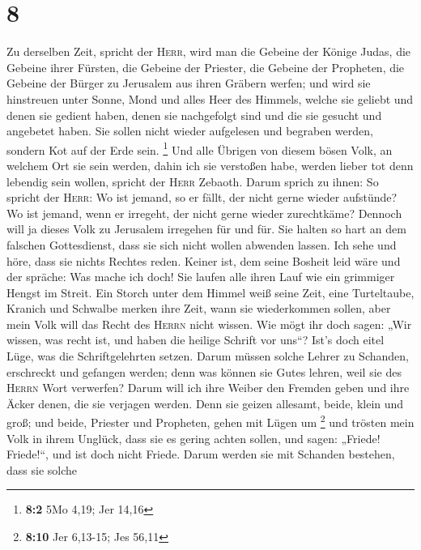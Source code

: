 \hypertarget{section-2}{%
\section{8}\label{section-2}}

 Zu derselben Zeit, spricht der \textsc{Herr}, wird man
die Gebeine der Könige Judas, die Gebeine ihrer Fürsten, die Gebeine der
Priester, die Gebeine der Propheten, die Gebeine der Bürger zu Jerusalem
aus ihren Gräbern werfen;  und wird sie hinstreuen unter
Sonne, Mond und alles Heer des Himmels, welche sie geliebt und denen sie
gedient haben, denen sie nachgefolgt sind und die sie gesucht und
angebetet haben. Sie sollen nicht wieder aufgelesen und begraben werden,
sondern Kot auf der Erde sein. \footnote{\textbf{8:2} 5Mo 4,19; Jer
  14,16}  Und alle Übrigen von diesem bösen Volk, an
welchem Ort sie sein werden, dahin ich sie verstoßen habe, werden lieber
tot denn lebendig sein wollen, spricht der \textsc{Herr} Zebaoth.
 Darum sprich zu ihnen: So spricht der \textsc{Herr}: Wo
ist jemand, so er fällt, der nicht gerne wieder aufstünde? Wo ist
jemand, wenn er irregeht, der nicht gerne wieder zurechtkäme?
 Dennoch will ja dieses Volk zu Jerusalem irregehen für
und für. Sie halten so hart an dem falschen Gottesdienst, dass sie sich
nicht wollen abwenden lassen.  Ich sehe und höre, dass sie
nichts Rechtes reden. Keiner ist, dem seine Bosheit leid wäre und der
spräche: Was mache ich doch! Sie laufen alle ihren Lauf wie ein
grimmiger Hengst im Streit.  Ein Storch unter dem Himmel
weiß seine Zeit, eine Turteltaube, Kranich und Schwalbe merken ihre
Zeit, wann sie wiederkommen sollen, aber mein Volk will das Recht des
\textsc{Herrn} nicht wissen.  Wie mögt ihr doch sagen:
„Wir wissen, was recht ist, und haben die heilige Schrift vor uns``?
Ist's doch eitel Lüge, was die Schriftgelehrten setzen. 
Darum müssen solche Lehrer zu Schanden, erschreckt und gefangen werden;
denn was können sie Gutes lehren, weil sie des \textsc{Herrn} Wort
verwerfen?  Darum will ich ihre Weiber den Fremden geben
und ihre Äcker denen, die sie verjagen werden. Denn sie geizen allesamt,
beide, klein und groß; und beide, Priester und Propheten, gehen mit
Lügen um \footnote{\textbf{8:10} Jer 6,13-15; Jes 56,11} 
und trösten mein Volk in ihrem Unglück, dass sie es gering achten
sollen, und sagen: „Friede! Friede!{}``, und ist doch nicht Friede.
 Darum werden sie mit Schanden bestehen, dass sie solche

